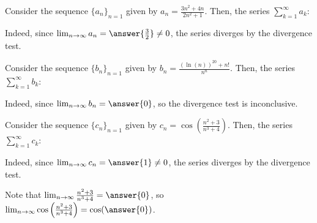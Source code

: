 \documentclass{ximera}
\author{Jim Talamo}
\begin{document}
\begin{exercise}
Consider the sequence $\{a_n\}_{n=1}$ given by $a_n = \frac{3n^2+4n}{2n^2+1}$.  Then, the series $\sum_{k=1}^{\infty} a_k$:

\begin{multipleChoice}
\end{multipleChoice}

Indeed, since $\lim_{n \to \infty} a_n = \answer{\frac{3}{2}} \neq 0$, the series diverges by the divergence test.
\end{exercise}

\begin{exercise}
Consider the sequence $\{b_n\}_{n=1}$ given by $b_n = \frac{(\ln(n))^{20}+n!}{n^n}$.   Then, the series $\sum_{k=1}^{\infty} b_k$:

\begin{multipleChoice}
\end{multipleChoice}

Indeed, since $\lim_{n \to \infty} b_n = \answer{0}$, so the divergence test is inconclusive.

\end{exercise}

\begin{exercise}
Consider the sequence $\{c_n\}_{n=1}$ given by $c_n = \cos \left(\frac{n^2+3}{n^3+4}\right)$.   Then, the series $\sum_{k=1}^{\infty} c_k$:

\begin{multipleChoice}
\end{multipleChoice}

Indeed, since $\lim_{n \to \infty} c_n = \answer{1} \neq 0$, the series diverges by the divergence test.

\begin{hint}
Note that $\lim_{n \to \infty} \frac{n^2+3}{n^3+4} = \answer{0}$, so $\lim_{n \to \infty}  \cos \left(\frac{n^2+3}{n^3+4}\right) = \cos(\answer{0})$.
\end{hint}
\end{exercise}
\end{document}
